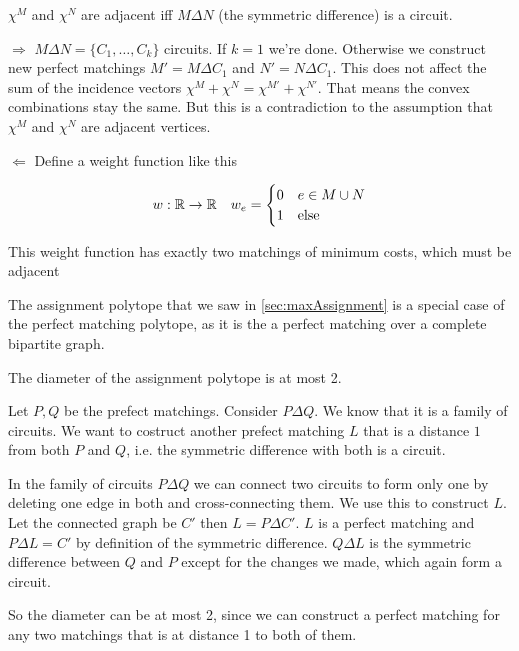 \begin{lem} $\chi^M$ and $\chi^N$ are adjacent iff $M\Delta N$ (the symmetric difference) is a circuit.\end{lem}

\begin{pr} $\Rightarrow$ $M\Delta N = \{C_1,\ldots, C_k\}$ circuits. If $k=1$ we're done. Otherwise we construct new perfect matchings $M'=M\Delta C_1$ and $N'=N\Delta C_1$. This does not affect the sum of the incidence vectors $\chi^M+\chi^N=\chi^{M'} +\chi^{N'}$. That means the convex combinations stay the same. But this is a contradiction to the assumption that $\chi^M$ and $\chi^N$ are adjacent vertices.

$\Leftarrow$ Define a weight function like this

\[w:\mathbb{R} \rightarrow \mathbb{R} \quad w_e=\begin{cases}0 & e\in M\cup N\\ 1 &\text{else}\end{cases}\]

This weight function has exactly two matchings of minimum costs, which must be adjacent
\end{pr}

The assignment polytope that we saw in \ref{sec:maxAssignment} is a special case of the perfect matching polytope, as it is the a perfect matching over a complete bipartite graph.

\begin{lem} The diameter of the assignment polytope is at most 2. \end{lem}

\begin{pr} Let $P,Q$ be the prefect matchings. Consider $P\Delta Q$. We know that it is a family of circuits. We want to costruct another prefect matching $L$ that is a distance $1$ from both $P$ and $Q$, i.e. the symmetric difference with both is a circuit.

In the family of circuits $P\Delta Q$ we can connect two circuits to form only one by deleting one edge in both and cross-connecting them. We use this to construct $L$. Let the connected graph be $C'$ then $L=P\Delta C'$. $L$ is a perfect matching and $P\Delta L=C'$ by definition of the symmetric difference. $Q\Delta L$ is the symmetric difference between $Q$ and $P$ except for the changes we made, which again form a circuit.

So the diameter can be at most 2, since we can construct a perfect matching for any two matchings that is at distance 1 to both of them.
\end{pr}

